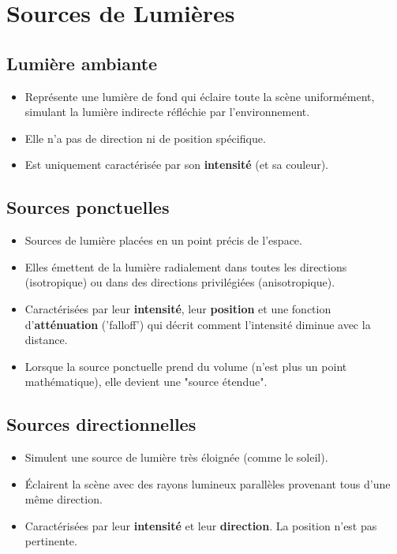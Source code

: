 \documentclass{article}
\begin{document}
\section{Sources de Lumières}

\subsection{Lumière ambiante}
\begin{itemize}
    \item Représente une lumière de fond qui éclaire toute la scène uniformément, simulant la lumière indirecte réfléchie par l'environnement.
    \item Elle n'a pas de direction ni de position spécifique.
    \item Est uniquement caractérisée par son \textbf{intensité} (et sa couleur).
\end{itemize}

\subsection{Sources ponctuelles}
\begin{itemize}
    \item Sources de lumière placées en un point précis de l'espace.
    \item Elles émettent de la lumière radialement dans toutes les directions (isotropique) ou dans des directions privilégiées (anisotropique).
    \item Caractérisées par leur \textbf{intensité}, leur \textbf{position} et une fonction d'\textbf{atténuation} ('falloff') qui décrit comment l'intensité diminue avec la distance.
    \item Lorsque la source ponctuelle prend du volume (n'est plus un point mathématique), elle devient une "source étendue".
\end{itemize}

\subsection{Sources directionnelles}
\begin{itemize}
    \item Simulent une source de lumière très éloignée (comme le soleil).
    \item Éclairent la scène avec des rayons lumineux parallèles provenant tous d'une même direction.
    \item Caractérisées par leur \textbf{intensité} et leur \textbf{direction}. La position n'est pas pertinente.
\end{itemize}
\end{document}
